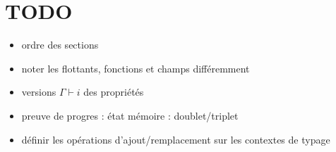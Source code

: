 \section*{TODO}

\begin{itemize}
\item ordre des sections
\item noter les flottants, fonctions et champs différemment
\item versions $Γ ⊢ i$ des propriétés
\item preuve de progres : état mémoire : doublet/triplet
\item définir les opérations d'ajout/remplacement sur les contextes de typage
\end{itemize}
